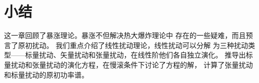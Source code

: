 \section{小结}

这一章回顾了暴涨理论。暴涨不但解决热大爆炸理论中
存在的一些疑难，而且预言了原初扰动。
我们重点介绍了线性扰动理论，线性扰动可以分解
为三种扰动类型——标量扰动、矢量扰动和张量扰动，在线性阶他们各自独立演化。
推导出标量扰动和张量扰动的演化方程，在慢滚条件下讨论了方程的解，
计算了张量扰动和标量扰动的原初功率谱。
